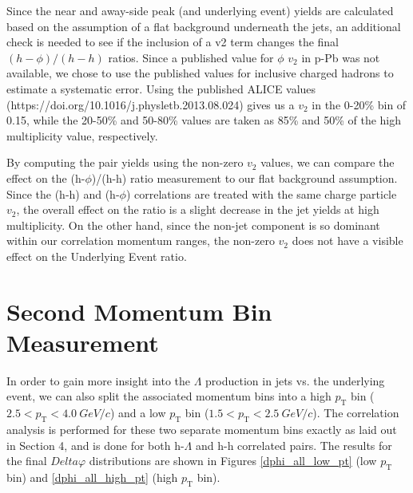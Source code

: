 \documentclass[ALICE,manyauthors]{ALICE_analysis_notes}
\begin{document}
Since the near and away-side peak (and underlying event) yields are calculated based on the assumption of a flat background underneath the jets, an additional check is needed to see if the inclusion of a v2 term changes the final $(h-\phi)/(h-h)$ ratios.  Since a published value for $\phi$ $v_2$ in p-Pb was not available, we chose to use the published values for inclusive charged hadrons to estimate a systematic error.  Using the published ALICE values (https://doi.org/10.1016/j.physletb.2013.08.024) gives us a $v_2$ in the 0-20\% bin of 0.15, while the 20-50\% and 50-80\% values are taken as 85\% and 50\% of the high multiplicity value, respectively.

By computing the pair yields using the non-zero $v_2$ values, we can compare the effect on the (h-$\phi$)/(h-h) ratio measurement to our flat background assumption.  Since the (h-h) and (h-$\phi$) correlations are treated with the same charge particle $v_2$, the overall effect on the ratio is a slight decrease in the jet yields at high multiplicity.  On the other hand, since the non-jet component is so dominant within our correlation momentum ranges, the non-zero $v_2$ does not have a visible effect on the Underlying Event ratio.


\clearpage
\appendix
\section{Second Momentum Bin Measurement}

In order to gain more insight into the $\Lambda$ production in jets vs. the underlying event, we can also split the associated momentum bins into a high $p_{\text{T}}$ bin ($2.5 < p_{\text{T}} < \SI{4.0}{GeV/c}$) and a low $p_{\text{T}}$ bin ($1.5 < p_{\text{T}} < \SI{2.5}{GeV/c}$).  The correlation analysis is performed for these two separate momentum bins exactly as laid out in Section 4, and is done for both h-$\Lambda$ and h-h correlated pairs. The results for the final $Delta\varphi$ distributions are shown in Figures \ref{dphi_all_low_pt} (low $p_{\text{T}}$ bin) and \ref{dphi_all_high_pt} (high $p_{\text{T}}$ bin).
\end{document}
